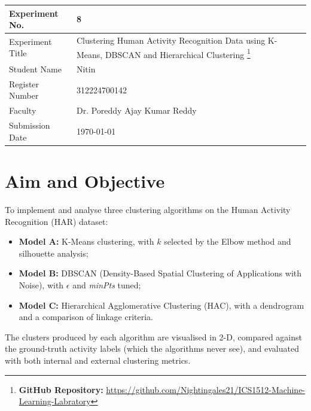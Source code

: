 \documentclass[12pt,a4paper]{article}
\DeclareRobustCommand{\_}{\textunderscore\allowbreak}
\begin{document}
\noindent\begin{tabular}{|p{4cm}|p{\dimexpr\linewidth-4cm-4\tabcolsep-3\arrayrulewidth\relax}|}
\hline
Experiment No. & 8 \\ \hline
Experiment Title & Clustering Human Activity Recognition Data using K-Means, DBSCAN and Hierarchical Clustering
\footnote{\textbf{GitHub Repository: }\url{https://github.com/Nightingales21/ICS1512-Machine-Learning-Labratory}}\\ \hline
Student Name & Nitin \\ \hline
Register Number & 312224700142 \\ \hline
Faculty & Dr. Poreddy Ajay Kumar Reddy \\ \hline
Submission Date & \today \\ \hline
\end{tabular}

\section{Aim and Objective}
To implement and analyse three clustering algorithms on the Human Activity
Recognition (HAR) dataset:
\begin{itemize}[nosep]
\item \textbf{Model A:} K-Means clustering, with $k$ selected by the Elbow
method and silhouette analysis;
\item \textbf{Model B:} DBSCAN (Density-Based Spatial Clustering of
Applications with Noise), with $\epsilon$ and \textit{minPts} tuned;
\item \textbf{Model C:} Hierarchical Agglomerative Clustering (HAC), with a
dendrogram and a comparison of linkage criteria.
\end{itemize}
The clusters produced by each algorithm are visualised in 2-D, compared
against the ground-truth activity labels (which the algorithms never see),
and evaluated with both internal and external clustering metrics.
\end{document}
